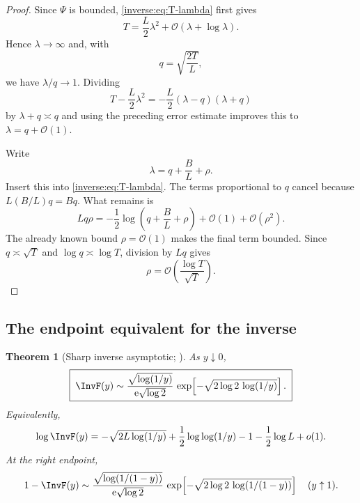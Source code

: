 \documentclass[11pt,oneside]{article}
\newtheorem{theorem}{Theorem}[section]
\theoremstyle{definition}
\theoremstyle{remark}
\newcommand{\e}{\mathrm e}
\newcommand{\bigO}{\mathcal O}
\begin{document}
\begin{proof}
Since $\Psi$ is bounded, \eqref{inverse:eq:T-lambda} first gives
\[
 T=\frac L2\lambda^2+\bigO(\lambda+\log\lambda).
\]
Hence $\lambda\to\infty$ and, with
\[
 q=\sqrt{\frac{2T}{L}},
\]
we have $\lambda/q\to1$.  Dividing
\[
 T-\frac L2\lambda^2
 =-\frac L2(\lambda-q)(\lambda+q)
\]
by $\lambda+q\asymp q$ and using the preceding error estimate improves
this to $\lambda=q+\bigO(1)$.

Write
\[
 \lambda=q+\frac BL+\rho.
\]
Insert this into \eqref{inverse:eq:T-lambda}.  The terms proportional to $q$
cancel because $L(B/L)q=Bq$.  What remains is
\[
 Lq\rho
 =-\frac12\log\!\left(q+\frac BL+\rho\right)+\bigO(1)
   +\bigO(\rho^2).
\]
The already known bound $\rho=\bigO(1)$ makes the final term bounded.
Since $q\asymp\sqrt T$ and $\log q\asymp\log T$, division by $Lq$ gives
\[
 \rho=\bigO\!\left(\frac{\log T}{\sqrt T}\right).
\]
\end{proof}

\subsection{The endpoint equivalent for the inverse}

\begin{theorem}[Sharp inverse asymptotic; \Derived]
\label{inverse:thm:sharp-inverse-asymptotic}
As $y\downarrow0$,
\begin{equation}
 \boxed{\;
 \InvF(y)\sim
 \frac{\sqrt{\log(1/y)}}{\e\sqrt{\log2}}\,
 \exp\!\left[-\sqrt{2\log2\,\log(1/y)}\right].
 \;} \label{inverse:eq:sharp-inverse}
\end{equation}
Equivalently,
\begin{equation}
 \log\InvF(y)
 =-\sqrt{2L\log(1/y)}
  +\frac12\log\log(1/y)
  -1-\frac12\log L+o(1). \label{inverse:eq:log-sharp-inverse}
\end{equation}
At the right endpoint,
\begin{equation}
 1-\InvF(y)\sim
 \frac{\sqrt{\log(1/(1-y))}}{\e\sqrt{\log2}}\,
 \exp\!\left[-\sqrt{2\log2\,\log(1/(1-y))}\right]
 \quad(y\uparrow1). \label{inverse:eq:right-inverse-asymptotic}
\end{equation}
\end{theorem}
\end{document}
